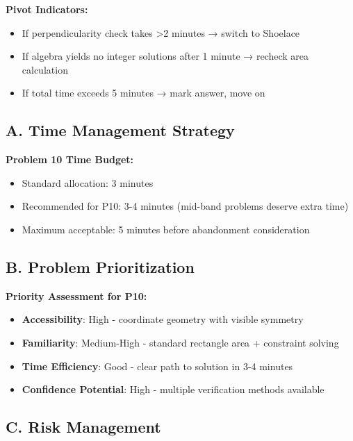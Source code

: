 \documentclass[]{article}
\begin{document}
\begin{solutionbox}
\textbf{Pivot Indicators:}
\begin{itemize}[leftmargin=*]
    \item If perpendicularity check takes >2 minutes → switch to Shoelace
    \item If algebra yields no integer solutions after 1 minute → recheck area calculation
    \item If total time exceeds 5 minutes → mark answer, move on
\end{itemize}
\end{solutionbox}

\begin{competitionbox}
\subsection*{A. Time Management Strategy}

\textbf{Problem 10 Time Budget:}
\begin{itemize}[leftmargin=*]
    \item Standard allocation: 3 minutes
    \item Recommended for P10: 3-4 minutes (mid-band problems deserve extra time)
    \item Maximum acceptable: 5 minutes before abandonment consideration
\end{itemize}

\subsection*{B. Problem Prioritization}

\textbf{Priority Assessment for P10:}
\begin{itemize}[leftmargin=*]
    \item \textbf{Accessibility}: High - coordinate geometry with visible symmetry
    \item \textbf{Familiarity}: Medium-High - standard rectangle area + constraint solving
    \item \textbf{Time Efficiency}: Good - clear path to solution in 3-4 minutes
    \item \textbf{Confidence Potential}: High - multiple verification methods available
\end{itemize}

\subsection*{C. Risk Management}


\end{competitionbox}
\end{document}
